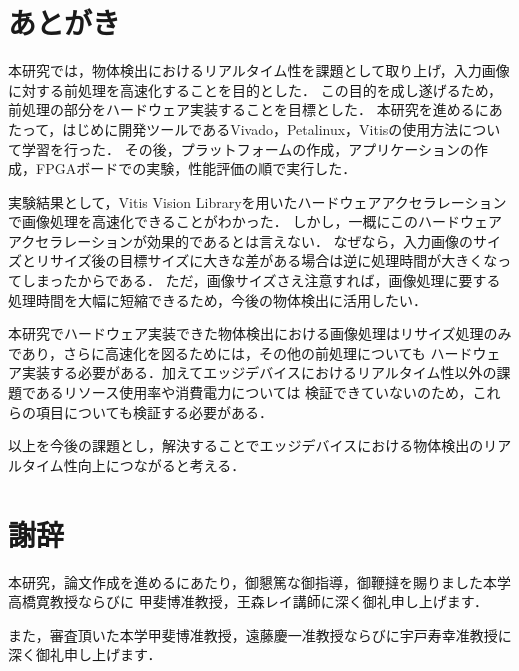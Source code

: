 \documentclass[11pt,a4j]{jreport}
\begin{document}
\chapter{あとがき}
本研究では，物体検出におけるリアルタイム性を課題として取り上げ，入力画像に対する前処理を高速化することを目的とした．
この目的を成し遂げるため，前処理の部分をハードウェア実装することを目標とした．
本研究を進めるにあたって，はじめに開発ツールであるVivado，Petalinux，Vitisの使用方法について学習を行った．
その後，プラットフォームの作成，アプリケーションの作成，FPGAボードでの実験，性能評価の順で実行した．

実験結果として，Vitis Vision Libraryを用いたハードウェアアクセラレーションで画像処理を高速化できることがわかった．
しかし，一概にこのハードウェアアクセラレーションが効果的であるとは言えない．
なぜなら，入力画像のサイズとリサイズ後の目標サイズに大きな差がある場合は逆に処理時間が大きくなってしまったからである．
ただ，画像サイズさえ注意すれば，画像処理に要する処理時間を大幅に短縮できるため，今後の物体検出に活用したい．

本研究でハードウェア実装できた物体検出における画像処理はリサイズ処理のみであり，さらに高速化を図るためには，その他の前処理についても
ハードウェア実装する必要がある．加えてエッジデバイスにおけるリアルタイム性以外の課題であるリソース使用率や消費電力については
検証できていないのため，これらの項目についても検証する必要がある．

以上を今後の課題とし，解決することでエッジデバイスにおける物体検出のリアルタイム性向上につながると考える．

\chapter*{謝辞} %
本研究，論文作成を進めるにあたり，御懇篤な御指導，御鞭撻を賜りました本学高橋寛教授ならびに
甲斐博准教授，王森レイ講師に深く御礼申し上げます．

また，審査頂いた本学甲斐博准教授，遠藤慶一准教授ならびに宇戸寿幸准教授に深く御礼申し上げます．
\end{document}

